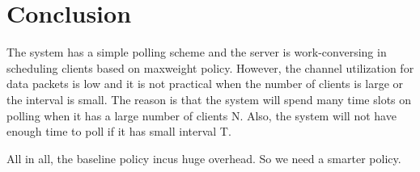 \documentclass{article}
\begin{document}
\section{Conclusion}
The system has a simple polling scheme and the server is work-conversing in scheduling clients based on maxweight policy. However, the channel utilization for data packets is low and it is not practical when the number of clients is large or the interval is small. The reason is that the system will spend many time slots on polling when it has a large number of clients N. Also, the system will not have enough time to poll if it has small interval T. 

All in all, the baseline policy incus huge overhead. So we need a smarter policy.
\end{document}
